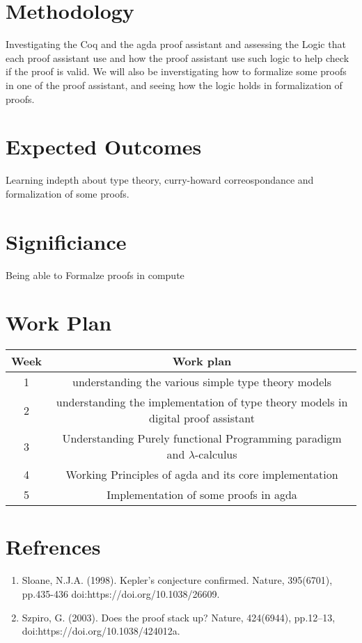 \documentclass{article}
\begin{document}
\section{Methodology}
Investigating the  Coq and the agda proof assistant and assessing the Logic that each proof assistant use and how the proof assistant use such logic to help check if the proof is valid.
We will also be inverstigating how to formalize some proofs in one of the proof assistant, and seeing how the logic holds in formalization of proofs. 

\section{Expected Outcomes}
Learning indepth about type theory, curry-howard correospondance and formalization of some proofs.  
\section{Significiance}
Being able to Formalze proofs in compute
\section{Work Plan}
\begin{center}
    \begin{tabular}{|c|c|}
        \hline
        Week & Work plan \\
        \hline
         1 & understanding the various simple type theory models \\
        \hline
         2 & understanding the implementation of type theory models in digital proof assistant \\
        \hline
         3 & Understanding Purely functional Programming paradigm and $ \lambda $-calculus\\
        \hline
         4 & Working Principles of agda and its core implementation \\
        \hline 
         5 & Implementation of some proofs in agda \\
        \hline


    \end{tabular}
\end{center}
\pagebreak


\section{Refrences}
\begin{enumerate}
    \item Sloane, N.J.A. (1998). Kepler's conjecture confirmed. Nature, 395(6701), pp.435-436 doi:https://doi.org/10.1038/26609.
    \item Szpiro, G. (2003). Does the proof stack up? Nature, 424(6944), pp.12–13,  doi:https://doi.org/10.1038/424012a.

\end{enumerate} 
\end{document}

